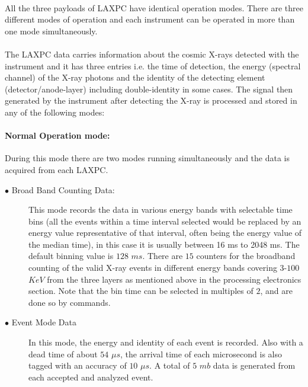 \documentclass[a4paper,twoside]{report}
\numberwithin{equation}{section}
\begin{document}
\paragraph{}
All the three payloads of LAXPC have identical operation modes. There are three different modes of operation and each instrument can be operated in more than one mode simultaneously.
\paragraph{}
The LAXPC data carries information about the cosmic X-rays detected with the instrument and it has three entries i.e. the time of detection, the energy (spectral channel) of the X-ray photons and the identity of the detecting element (detector/anode-layer) including double-identity in some cases. The signal then generated by the instrument after detecting the X-ray is processed and stored in any of the following modes:
\paragraph{Normal Operation mode:}
During this mode there are two modes running simultaneously and the data is acquired from each LAXPC.
\begin{description}
\item[$\bullet$ Broad Band Counting Data:]
This mode records the data in various energy bands with selectable time bins (all the events within a time interval selected would be replaced by an energy value representative of that interval, often being the energy value of the median time), in this case it is usually between 16 ms to 2048 ms. The default binning value is $128$ $ms$. There are $15$ counters for the broadband counting of the valid X-ray events in different energy bands covering $3$-$100$ $KeV$ from the three layers as mentioned above in the processing electronics section. Note that the bin time can be selected in multiples of $2$, and are done so by commands.
\item[$\bullet$ Event Mode Data]
In this mode, the energy and identity of each event is recorded. Also with a dead time of about $54$ $\mu s$, the arrival time of each microsecond is also tagged with an accuracy of $10$ $\mu s$. A total of $5$ $mb$ data is generated from each accepted and analyzed event.
\end{description}
\end{document}
